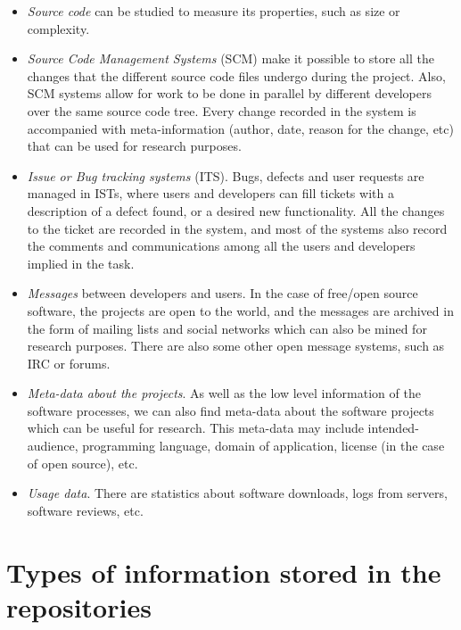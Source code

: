 \documentclass[]{book}
\theoremstyle{definition}
\theoremstyle{definition}
\theoremstyle{remark}
\begin{document}
\begin{itemize}
\item
  \emph{Source code} can be studied to measure its properties, such as
  size or complexity.
\item
  \emph{Source Code Management Systems} (SCM) make it possible to store
  all the changes that the different source code files undergo during
  the project. Also, SCM systems allow for work to be done in parallel
  by different developers over the same source code tree. Every change
  recorded in the system is accompanied with meta-information (author,
  date, reason for the change, etc) that can be used for research
  purposes.
\item
  \emph{Issue or Bug tracking systems} (ITS). Bugs, defects and user
  requests are managed in ISTs, where users and developers can fill
  tickets with a description of a defect found, or a desired new
  functionality. All the changes to the ticket are recorded in the
  system, and most of the systems also record the comments and
  communications among all the users and developers implied in the task.
\item
  \emph{Messages} between developers and users. In the case of free/open
  source software, the projects are open to the world, and the messages
  are archived in the form of mailing lists and social networks which
  can also be mined for research purposes. There are also some other
  open message systems, such as IRC or forums.
\item
  \emph{Meta-data about the projects}. As well as the low level
  information of the software processes, we can also find meta-data
  about the software projects which can be useful for research. This
  meta-data may include intended-audience, programming language, domain
  of application, license (in the case of open source), etc.
\item
  \emph{Usage data}. There are statistics about software downloads, logs
  from servers, software reviews, etc.
\end{itemize}

\section{Types of information stored in the
repositories}\label{types-of-information-stored-in-the-repositories}
\end{document}
